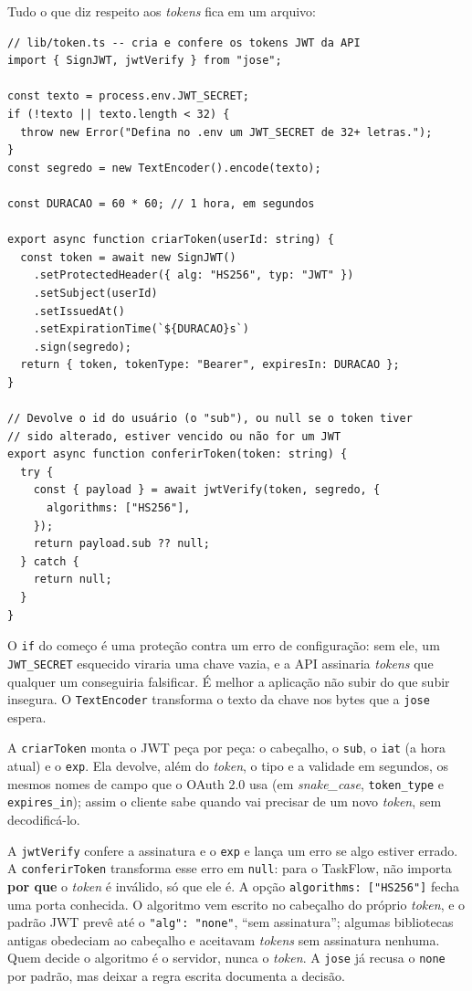 Tudo o que diz respeito aos \textit{tokens} fica em um arquivo:

\begin{codigo}
\begin{Verbatim}[breaklines=true, breaksymbolleft={}, fontsize=\footnotesize]
// lib/token.ts -- cria e confere os tokens JWT da API
import { SignJWT, jwtVerify } from "jose";

const texto = process.env.JWT_SECRET;
if (!texto || texto.length < 32) {
  throw new Error("Defina no .env um JWT_SECRET de 32+ letras.");
}
const segredo = new TextEncoder().encode(texto);

const DURACAO = 60 * 60; // 1 hora, em segundos

export async function criarToken(userId: string) {
  const token = await new SignJWT()
    .setProtectedHeader({ alg: "HS256", typ: "JWT" })
    .setSubject(userId)
    .setIssuedAt()
    .setExpirationTime(`${DURACAO}s`)
    .sign(segredo);
  return { token, tokenType: "Bearer", expiresIn: DURACAO };
}

// Devolve o id do usuário (o "sub"), ou null se o token tiver
// sido alterado, estiver vencido ou não for um JWT
export async function conferirToken(token: string) {
  try {
    const { payload } = await jwtVerify(token, segredo, {
      algorithms: ["HS256"],
    });
    return payload.sub ?? null;
  } catch {
    return null;
  }
}
\end{Verbatim}
\end{codigo}

O \texttt{if} do começo é uma proteção contra um erro de configuração: sem ele, um \texttt{JWT\_SECRET} esquecido viraria uma chave vazia, e a API assinaria \textit{tokens} que qualquer um conseguiria falsificar. É melhor a aplicação não subir do que subir insegura. O \texttt{TextEncoder} transforma o texto da chave nos bytes que a \texttt{jose} espera.

A \texttt{criarToken} monta o JWT peça por peça: o cabeçalho, o \texttt{sub}, o \texttt{iat} (a hora atual) e o \texttt{exp}. Ela devolve, além do \textit{token}, o tipo e a validade em segundos, os mesmos nomes de campo que o OAuth 2.0 usa (em \textit{snake\_case}, \texttt{token\_type} e \texttt{expires\_in}); assim o cliente sabe quando vai precisar de um novo \textit{token}, sem decodificá-lo.

A \texttt{jwtVerify} confere a assinatura e o \texttt{exp} e lança um erro se algo estiver errado. A \texttt{conferirToken} transforma esse erro em \texttt{null}: para o TaskFlow, não importa \textbf{por que} o \textit{token} é inválido, só que ele é. A opção \texttt{algorithms: ["HS256"]} fecha uma porta conhecida. O algoritmo vem escrito no cabeçalho do próprio \textit{token}, e o padrão JWT prevê até o \texttt{"alg": "none"}, ``sem assinatura''; algumas bibliotecas antigas obedeciam ao cabeçalho e aceitavam \textit{tokens} sem assinatura nenhuma. Quem decide o algoritmo é o servidor, nunca o \textit{token}. A \texttt{jose} já recusa o \texttt{none} por padrão, mas deixar a regra escrita documenta a decisão.

